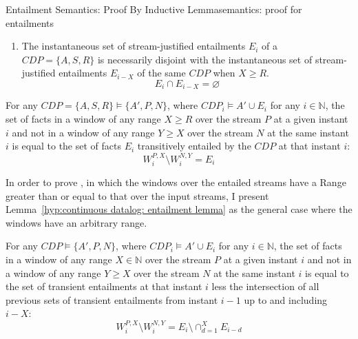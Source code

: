 \begin{nestedsection}{Entailment Semantics: Proof By Inductive Lemma}{semantics: proof for entailments}

	\begin{enumerate}\setcounter{enumi}{\thecontinuousDatalogAxioms}
		\item\label{axiom:continuous datalog: disjoint entailments}
			The instantaneous set of stream-justified entailments $E_{i}$ of a ${CDP = \{A,S,R\}}$ is necessarily disjoint with the instantaneous set of stream-justified entailments $E_{i-X}$ of the same ${CDP}$ when ${X \geq R}$.
			\begin{equation*}
				E_{i} \cap E_{i-X} = \varnothing
			\end{equation*}
		\setcounter{continuousDatalogAxioms}{\theenumi}
	\end{enumerate}	

	\begin{hyp}
		For any ${CDP = \{A,S,R\} \vDash \{A',P,N\}}$, where ${CDP_{i} \vDash A' \cup E_{i}}$ for any ${i \in \mathbb{N}}$, the set of facts in a window of any range ${X \geq R}$ over the stream $P$ at a given instant ${i}$ and not in a window of any range ${Y \geq X}$ over the stream $N$ at the same instant $i$ is equal to the set of facts $E_{i}$ transitively entailed by the ${CDP}$ at that instant $i$:
		\begin{equation*}
			W^{P,X}_{i} \setminus W^{N,Y}_{i} = E_{i}
		\end{equation*}
	\end{hyp}
	In order to prove , in which the windows over the entailed streams have a Range greater than or equal to that over the input streams, I present Lemma~\ref{hyp:continuous datalog: entailment lemma} as the general case where the windows have an arbitrary range.
	\begin{lem}\label{hyp:continuous datalog: entailment lemma}
		For any ${CDP \vDash \{A',P,N\}}$, where ${CDP_{i} \vDash A' \cup E_{i}}$ for any ${i \in \mathbb{N}}$, the set of facts in a window of any range ${X \in \mathbb{N}}$ over the stream $P$ at a given instant ${i}$ and not in a window of any range ${Y \geq X}$ over the stream $N$ at the same instant $i$ is equal to the set of transient entailments at that instant $i$ less the intersection of all previous sets of transient entailments from instant ${i-1}$ up to and including ${i-X}$:
		\begin{equation*}
			W^{P,X}_{i} \setminus W^{N,Y}_{i} = E_{i} \setminus \mathop{\cap}^{X}_{d=1} E_{i-d}
		\end{equation*}
	\end{lem}


\end{nestedsection}
